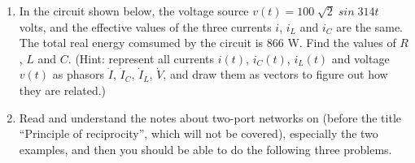 \begin{enumerate}
\item 
In the circuit shown below, the voltage source $v(t)=100\;\sqrt{2}\;sin\;314t\;$ volts,
and the effective values of the three currents $i$, $i_L$ and $i_C$ are the same. The
total real energy comsumed by the circuit is 866 W. Find the values of $R$, $L$ and $C$.
(Hint: represent all currents $i(t)$, $i_C(t)$, $i_L(t)$ and voltage $v(t)$ as phasors 
$\dot{I}$, $\dot{I}_C$, $\dot{I}_L$, $\dot{V}$, and draw them as vectors to figure out
how they are related.)



%

\item Read and understand the notes about two-port networks on 
(before the title ``Principle of reciprocity'', which will not be covered), especially
the two examples, and then you should be able to do the following three problems.


\end{enumerate}
